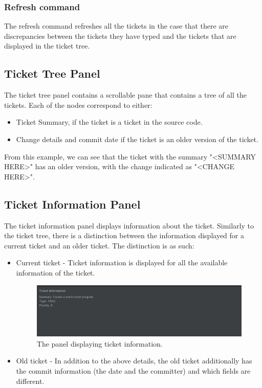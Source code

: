 \documentclass{4thYearProject}
\begin{document}
\subsubsection{Refresh command}

The refresh command refreshes all the tickets in the case that there are discrepancies between the tickets they have typed and the tickets that are displayed in the ticket tree.

\subsection{Ticket Tree Panel}

The ticket tree panel contains a scrollable pane that contains a tree of all the tickets. Each of the nodes correspond to either:
\begin{itemize}
\item Ticket Summary, if the ticket is a ticket in the source code. 
\item Change details and commit date if the ticket is an older version of the ticket. 
\end{itemize}


From this example, we can see that the ticket with the summary "<SUMMARY HERE>" has an older version, with the change indicated as "<CHANGE HERE>". 

\subsection{Ticket Information Panel}

The ticket information panel displays information about the ticket. Similarly to the ticket tree, there is a distinction between the information displayed for a current ticket and an older ticket. The distinction is as such:

\begin{itemize}
\item Current ticket - Ticket information is displayed for all the available information of the ticket.

\begin{figure}[H]
\includegraphics[scale=0.6]{Ticket_infopanel}
\centering
\caption{The panel displaying ticket information.}\label{ticketpanel}
\label{fig:ticketpanel}
\end{figure}

\item Old ticket - In addition to the above details, the old ticket additionally has the commit information (the date and the committer) and which fields are different.
\end{itemize}
\end{document}
